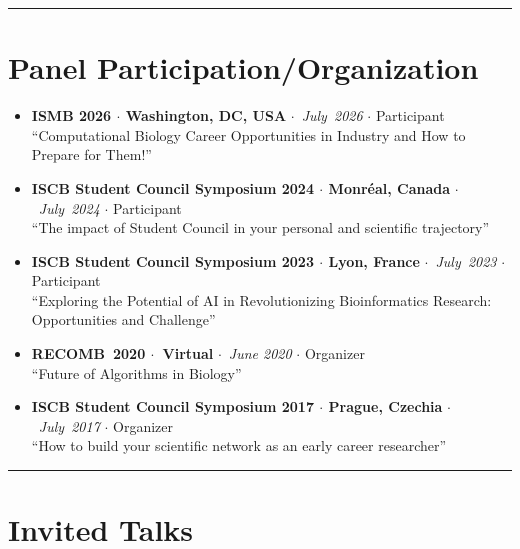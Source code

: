 \documentclass[10pt,letterpaper]{article}
\newcommand{\bigdot}{$\cdot$\xspace}
\newcommand{\cvsection}[1]{%
    \par\vspace{10pt}%
  \noindent\rule{\linewidth}{0.4pt}\par
  \vspace{-5.5ex}%
  \section*{#1}%
}
\begin{document}
\cvsection{Panel Participation/Organization}
\begin{itemize}%
  \item \textbf{ISMB 2026 \bigdot Washington, DC, USA} \bigdot~\textit{July~2026} \bigdot Participant \\ ``Computational Biology Career Opportunities in Industry and How to Prepare for Them!''  
  \item \textbf{ISCB Student Council Symposium 2024 \bigdot  Monr\'eal, Canada} \bigdot~\textit{July~2024} \bigdot Participant \\ ``The impact of Student Council in your personal and scientific trajectory''  
  \item \textbf{ISCB Student Council Symposium 2023 \bigdot  Lyon, France} \bigdot~\textit{July~2023} \bigdot Participant  \\ ``Exploring the Potential of AI in Revolutionizing Bioinformatics Research: Opportunities and Challenge''
  \item \textbf{RECOMB~2020 \bigdot~Virtual} \bigdot~\textit{June 2020} \bigdot  Organizer  \\ ``Future of Algorithms in Biology''
    \item \textbf{ISCB Student Council Symposium 2017 \bigdot Prague, Czechia} \bigdot~\textit{July~2017} \bigdot Organizer  \\ ``How to build your scientific network as an early career researcher''
\end{itemize}

\cvsection{Invited Talks}
\end{document}
